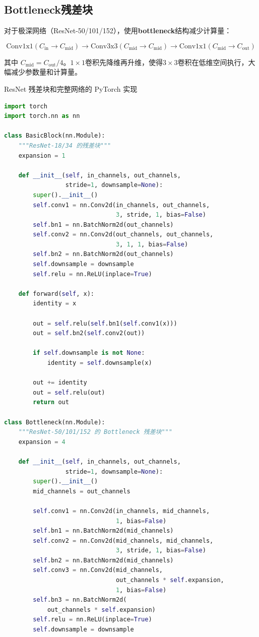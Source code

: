 \subsection{Bottleneck残差块}

对于极深网络（ResNet-50/101/152），使用\textbf{bottleneck}结构减少计算量：

\[
\text{Conv1x1}(C_{\text{in}} \to C_{\text{mid}}) \to \text{Conv3x3}(C_{\text{mid}} \to C_{\text{mid}}) \to \text{Conv1x1}(C_{\text{mid}} \to C_{\text{out}})
\]

其中 $C_{\text{mid}} = C_{\text{out}} / 4$。$1\times1$卷积先降维再升维，使得$3\times3$卷积在低维空间执行，大幅减少参数量和计算量。

\begin{mycode}{ResNet 残差块和完整网络的 PyTorch 实现}
\begin{lstlisting}[language=Python]
import torch
import torch.nn as nn

class BasicBlock(nn.Module):
    """ResNet-18/34 的残差块"""
    expansion = 1

    def __init__(self, in_channels, out_channels,
                 stride=1, downsample=None):
        super().__init__()
        self.conv1 = nn.Conv2d(in_channels, out_channels,
                               3, stride, 1, bias=False)
        self.bn1 = nn.BatchNorm2d(out_channels)
        self.conv2 = nn.Conv2d(out_channels, out_channels,
                               3, 1, 1, bias=False)
        self.bn2 = nn.BatchNorm2d(out_channels)
        self.downsample = downsample
        self.relu = nn.ReLU(inplace=True)

    def forward(self, x):
        identity = x

        out = self.relu(self.bn1(self.conv1(x)))
        out = self.bn2(self.conv2(out))

        if self.downsample is not None:
            identity = self.downsample(x)

        out += identity
        out = self.relu(out)
        return out

class Bottleneck(nn.Module):
    """ResNet-50/101/152 的 Bottleneck 残差块"""
    expansion = 4

    def __init__(self, in_channels, out_channels,
                 stride=1, downsample=None):
        super().__init__()
        mid_channels = out_channels

        self.conv1 = nn.Conv2d(in_channels, mid_channels,
                               1, bias=False)
        self.bn1 = nn.BatchNorm2d(mid_channels)
        self.conv2 = nn.Conv2d(mid_channels, mid_channels,
                               3, stride, 1, bias=False)
        self.bn2 = nn.BatchNorm2d(mid_channels)
        self.conv3 = nn.Conv2d(mid_channels,
                               out_channels * self.expansion,
                               1, bias=False)
        self.bn3 = nn.BatchNorm2d(
            out_channels * self.expansion)
        self.relu = nn.ReLU(inplace=True)
        self.downsample = downsample


\end{lstlisting}
\end{mycode}
